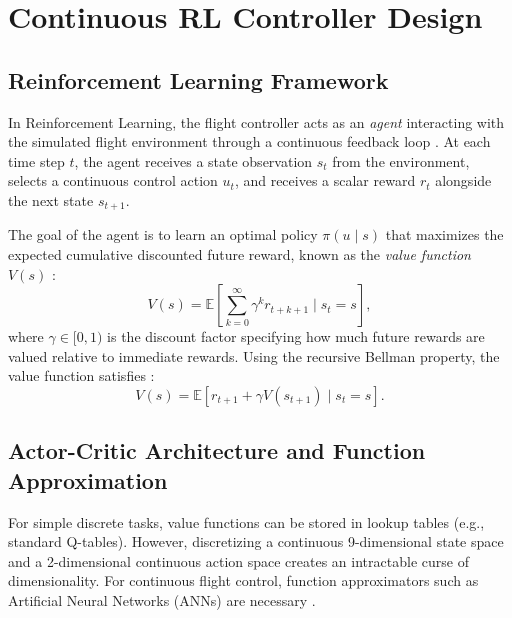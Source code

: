 \newpage
\section{Continuous RL Controller Design}
\label{sec:rl_controller_design}

\subsection{Reinforcement Learning Framework}
In Reinforcement Learning, the flight controller acts as an \emph{agent} interacting with the simulated flight environment through a continuous feedback loop \cite{vankampen2025lecture, sutton2018reinforcement}. At each time step $t$, the agent receives a state observation $s_t$ from the environment, selects a continuous control action $u_t$, and receives a scalar reward $r_t$ alongside the next state $s_{t+1}$.

The goal of the agent is to learn an optimal policy $\pi(u \mid s)$ that maximizes the expected cumulative discounted future reward, known as the \emph{value function} $V(s)$ \cite{vankampen2025lecture}:
\begin{equation}
    V(s) = \mathbb{E} \left[ \sum_{k=0}^{\infty} \gamma^k r_{t+k+1} \; |\; s_t = s \right],
    \label{eq:value_function}
\end{equation}
where $\gamma \in [0, 1)$ is the discount factor specifying how much future rewards are valued relative to immediate rewards. Using the recursive Bellman property, the value function satisfies \cite{vankampen2025lecture}:
\begin{equation}
    V(s) = \mathbb{E} \left[ r_{t+1} + \gamma V(s_{t+1}) \; | \; s_t = s \right].
    \label{eq:bellman_equation}
\end{equation}

\subsection{Actor-Critic Architecture and Function Approximation}
For simple discrete tasks, value functions can be stored in lookup tables (e.g., standard Q-tables). However, discretizing a continuous 9-dimensional state space and a 2-dimensional continuous action space creates an intractable curse of dimensionality. For continuous flight control, function approximators such as Artificial Neural Networks (ANNs) are necessary \cite{vankampen2025lecture}.

